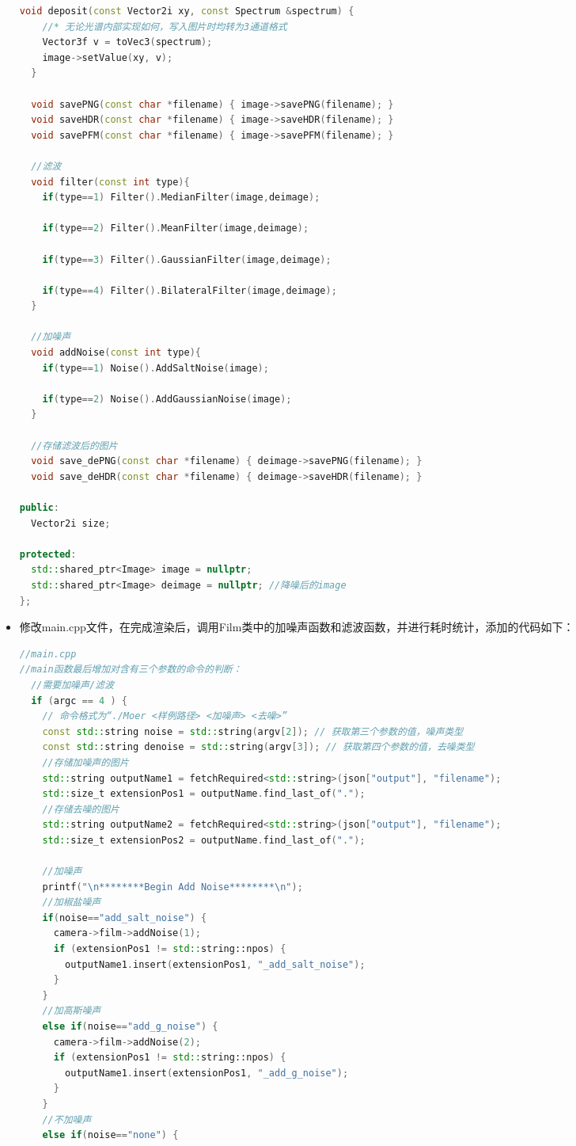 \documentclass[lang=cn,10pt]{elegantbook}
\begin{document}
\begin{itemize}
\begin{lstlisting}[language=c++]
  void deposit(const Vector2i xy, const Spectrum &spectrum) {
    //* 无论光谱内部实现如何，写入图片时均转为3通道格式
    Vector3f v = toVec3(spectrum);
    image->setValue(xy, v);
  }

  void savePNG(const char *filename) { image->savePNG(filename); }
  void saveHDR(const char *filename) { image->saveHDR(filename); } 
  void savePFM(const char *filename) { image->savePFM(filename); }

  //滤波
  void filter(const int type){
    if(type==1) Filter().MedianFilter(image,deimage);
    
    if(type==2) Filter().MeanFilter(image,deimage);

    if(type==3) Filter().GaussianFilter(image,deimage);

    if(type==4) Filter().BilateralFilter(image,deimage);  
  }

  //加噪声
  void addNoise(const int type){
    if(type==1) Noise().AddSaltNoise(image);
    
    if(type==2) Noise().AddGaussianNoise(image); 
  }

  //存储滤波后的图片
  void save_dePNG(const char *filename) { deimage->savePNG(filename); }
  void save_deHDR(const char *filename) { deimage->saveHDR(filename); }

public:
  Vector2i size;

protected:
  std::shared_ptr<Image> image = nullptr;
  std::shared_ptr<Image> deimage = nullptr; //降噪后的image
};
\end{lstlisting}

\item 修改main.cpp文件，在完成渲染后，调用Film类中的加噪声函数和滤波函数，并进行耗时统计，添加的代码如下：
\begin{lstlisting}[language=c++]
//main.cpp
//main函数最后增加对含有三个参数的命令的判断：
  //需要加噪声/滤波
  if (argc == 4 ) {
    // 命令格式为“./Moer <样例路径> <加噪声> <去噪>”
    const std::string noise = std::string(argv[2]); // 获取第三个参数的值，噪声类型
    const std::string denoise = std::string(argv[3]); // 获取第四个参数的值，去噪类型
    //存储加噪声的图片
    std::string outputName1 = fetchRequired<std::string>(json["output"], "filename");
    std::size_t extensionPos1 = outputName.find_last_of(".");
    //存储去噪的图片
    std::string outputName2 = fetchRequired<std::string>(json["output"], "filename");
    std::size_t extensionPos2 = outputName.find_last_of(".");
    
    //加噪声
    printf("\n********Begin Add Noise********\n");
    //加椒盐噪声
    if(noise=="add_salt_noise") {
      camera->film->addNoise(1);
      if (extensionPos1 != std::string::npos) {
        outputName1.insert(extensionPos1, "_add_salt_noise");
      }
    }
    //加高斯噪声
    else if(noise=="add_g_noise") {
      camera->film->addNoise(2);
      if (extensionPos1 != std::string::npos) {
        outputName1.insert(extensionPos1, "_add_g_noise");
      }
    }
    //不加噪声
    else if(noise=="none") {
        

\end{lstlisting}
\end{itemize}
\end{document}
